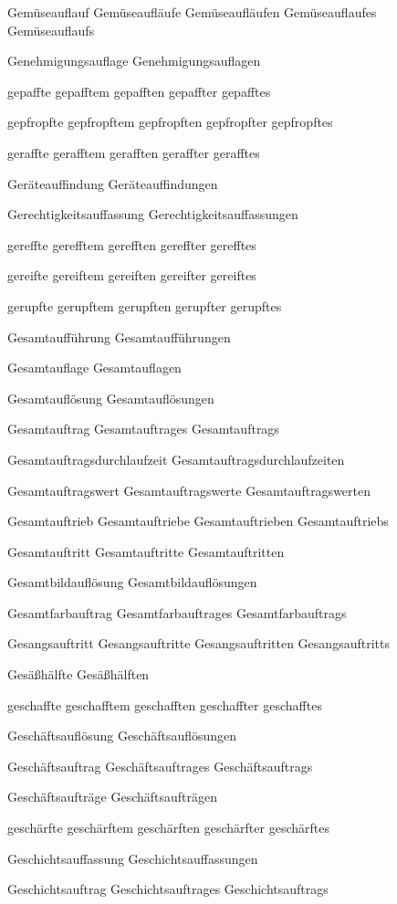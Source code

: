 Gemüseauflauf
Gemüseaufläufe
Gemüseaufläufen
Gemüseauflaufes
Gemüseauflaufs

Genehmigungsauflage
Genehmigungsauflagen

gepaffte
gepafftem
gepafften
gepaffter
gepafftes

gepfropfte
gepfropftem
gepfropften
gepfropfter
gepfropftes

geraffte
gerafftem
gerafften
geraffter
gerafftes

Geräteauffindung
Geräteauffindungen

Gerechtigkeitsauffassung
Gerechtigkeitsauffassungen

gereffte
gerefftem
gerefften
gereffter
gerefftes

gereifte
gereiftem
gereiften
gereifter
gereiftes

gerupfte
gerupftem
gerupften
gerupfter
gerupftes

Gesamtaufführung
Gesamtaufführungen

Gesamtauflage
Gesamtauflagen

Gesamtauflösung
Gesamtauflösungen

Gesamtauftrag
Gesamtauftrages
Gesamtauftrags

Gesamtauftragsdurchlaufzeit
Gesamtauftragsdurchlaufzeiten

Gesamtauftragswert
Gesamtauftragswerte
Gesamtauftragswerten

Gesamtauftrieb
Gesamtauftriebe
Gesamtauftrieben
Gesamtauftriebs

Gesamtauftritt
Gesamtauftritte
Gesamtauftritten

Gesamtbildauflösung
Gesamtbildauflösungen

Gesamtfarbauftrag
Gesamtfarbauftrages
Gesamtfarbauftrags

Gesangsauftritt
Gesangsauftritte
Gesangsauftritten
Gesangsauftritts

Gesäßhälfte
Gesäßhälften

geschaffte
geschafftem
geschafften
geschaffter
geschafftes

Geschäftsauflösung
Geschäftsauflösungen

Geschäftsauftrag
Geschäftsauftrages
Geschäftsauftrags

Geschäftsaufträge
Geschäftsaufträgen

geschärfte
geschärftem
geschärften
geschärfter
geschärftes

Geschichtsauffassung
Geschichtsauffassungen

Geschichtsauftrag
Geschichtsauftrages
Geschichtsauftrags

